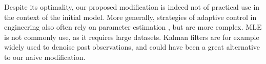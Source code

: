 \documentclass[FinalReport.tex]{subfiles}
\begin{document}
Despite its optimality, our proposed modification is indeed not of practical use in the context of the initial model. More generally, strategies of adaptive control in engineering also often rely on parameter estimation \cite{adapt-control}, but are more complex. MLE is not commonly use, as it requires large datasets. Kalman filters are for example widely used to denoise past observations, and could have been a great alternative to our naive modification.


 
\end{document}
